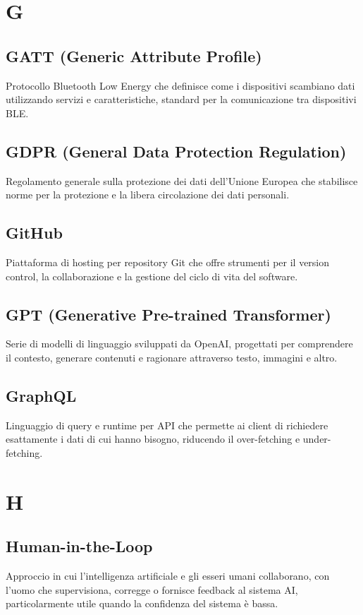 \documentclass[a4paper,11pt]{article}
\begin{document}
\newpage
\section{G}

\subsection{GATT (Generic Attribute Profile)}
Protocollo Bluetooth Low Energy che definisce come i dispositivi scambiano dati utilizzando servizi e caratteristiche, standard per la comunicazione tra dispositivi BLE.

\subsection{GDPR (General Data Protection Regulation)}
Regolamento generale sulla protezione dei dati dell'Unione Europea che stabilisce norme per la protezione e la libera circolazione dei dati personali.

\subsection{GitHub}
Piattaforma di hosting per repository Git che offre strumenti per il version control, la collaborazione e la gestione del ciclo di vita del software.

\subsection{GPT (Generative Pre-trained Transformer)}
Serie di modelli di linguaggio sviluppati da OpenAI, progettati per comprendere il contesto, generare contenuti e ragionare attraverso testo, immagini e altro.

\subsection{GraphQL}
Linguaggio di query e runtime per API che permette ai client di richiedere esattamente i dati di cui hanno bisogno, riducendo il over-fetching e under-fetching.

\newpage
\section{H}

\subsection{Human-in-the-Loop}
Approccio in cui l'intelligenza artificiale e gli esseri umani collaborano, con l'uomo che supervisiona, corregge o fornisce feedback al sistema AI, particolarmente utile quando la confidenza del sistema è bassa.
\end{document}
